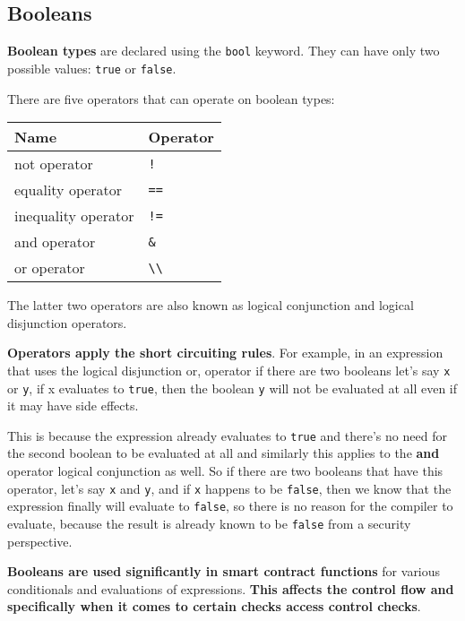\subsection{Booleans}\label{booleans}

\textbf{Boolean types} are declared using the \texttt{bool} keyword.
They can have only two possible values: \texttt{true} or \texttt{false}.

There are five operators that can operate on boolean types:

\begin{longtable}[]{@{}ll@{}}
\toprule\noalign{}
Name & Operator \\
\midrule\noalign{}
\endhead
\bottomrule\noalign{}
\endlastfoot
not operator & \texttt{!} \\
equality operator & \texttt{==} \\
inequality operator & \texttt{!=} \\
and operator & \texttt{\&} \\
or operator &
\texttt{\textbackslash{}\textbar{}\textbackslash{}\textbar{}} \\
\end{longtable}

The latter two operators are also known as logical conjunction and
logical disjunction operators.

\textbf{Operators apply the short circuiting rules}. For example, in an
expression that uses the logical disjunction or, operator if there are
two booleans let's say \texttt{x} or \texttt{y}, if x evaluates to
\texttt{true}, then the boolean \texttt{y} will not be evaluated at all
even if it may have side effects.

This is because the expression already evaluates to \texttt{true} and
there's no need for the second boolean to be evaluated at all and
similarly this applies to the \textbf{and} operator logical conjunction
as well. So if there are two booleans that have this operator, let's say
\texttt{x} and \texttt{y}, and if \texttt{x} happens to be
\texttt{false}, then we know that the expression finally will evaluate
to \texttt{false}, so there is no reason for the compiler to evaluate,
because the result is already known to be \texttt{false} from a security
perspective.

\textbf{Booleans are used significantly in smart contract functions} for
various conditionals and evaluations of expressions. \textbf{This
affects the control flow and specifically when it comes to certain
checks access control checks}.

